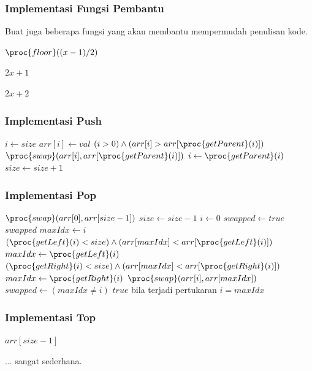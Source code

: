 \begin{frame}
\frametitle{Implementasi Fungsi Pembantu}
Buat juga beberapa fungsi yang akan membantu mempermudah penulisan kode.
\begin{codebox}
\li \Return $\proc{floor}((x-1) / 2)$
\end{codebox}

\begin{codebox}
\li \Return $2x + 1$
\end{codebox}

\begin{codebox}
\li \Return $2x + 2$
\end{codebox}
\end{frame}

\begin{frame}
\frametitle{Implementasi Push}
\begin{codebox}
\li $i \gets size$
\li $arr[i] \gets val$
\li \While $(i > 0) \land (arr[i] > arr[\proc{getParent}(i)])$  \Do
\li   $\proc{swap}(arr[i], arr[\proc{getParent}(i)])$
\li   $i \gets \proc{getParent}(i)$
    \End
\li $size \gets size + 1$
\end{codebox}
\end{frame}

\begin{frame}
\frametitle{Implementasi Pop}
\begin{codebox}
\li $\proc{swap}(arr[0], arr[size-1])$
\li $size \gets size - 1$
\li $i \gets 0$
\li $swapped \gets true$
\li \While $swapped$  \Do
\li   $maxIdx \gets i$
\li   \If $(\proc{getLeft}(i) < size) \land (arr[maxIdx] < arr[\proc{getLeft}(i)])$ \Then
\li     $maxIdx \gets \proc{getLeft}(i)$
      \End
\li   \If $(\proc{getRight}(i) < size) \land (arr[maxIdx] < arr[\proc{getRight}(i)])$ \Then
\li     $maxIdx \gets \proc{getRight}(i)$
      \End
\li   $\proc{swap}(arr[i], arr[maxIdx])$
\li   $swapped \gets (maxIdx \ne i)$ 
\Comment $true$ bila terjadi pertukaran
\li   $i = maxIdx$
    \End
\end{codebox}
\end{frame}

\begin{frame}
\frametitle{Implementasi Top}
\begin{codebox}
  \Return $arr[size-1]$
\end{codebox}

... sangat sederhana.
\end{frame}

